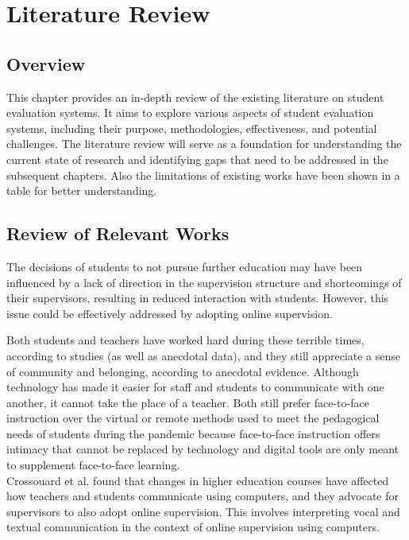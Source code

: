 \chapter{Literature Review}

\section{Overview}
This chapter provides an in-depth review of the existing literature on student evaluation systems. It aims to explore various aspects of student evaluation systems, including their purpose, methodologies, effectiveness, and potential challenges. The literature review will serve as a foundation for understanding the current state of research and identifying gaps that need to be addressed in the subsequent chapters. Also the limitations of existing works have been shown in a table for better understanding.


\section{Review of Relevant Works}

The decisions of students to not pursue further education may have been influenced by a lack of direction in the supervision structure and shortcomings of their supervisors, resulting in reduced interaction with students. However, this issue could be effectively addressed by adopting online supervision.

Both students and teachers have worked hard during these terrible times, according to studies (as well as anecdotal data), and they still appreciate a sense of community and belonging, according to anecdotal evidence. Although technology has made it easier for staff and students to communicate with one another, it cannot take the place of a teacher. Both still prefer face-to-face instruction over the virtual or remote methods used to meet the pedagogical needs of students during the pandemic because face-to-face instruction offers intimacy that cannot be replaced by technology and digital tools are only meant to supplement face-to-face learning.\cite{sia2020facing}\\

Crossouard et al. found that changes in higher education courses have affected how teachers and students communicate using computers, and they advocate for supervisors to also adopt online supervision. This involves interpreting vocal and textual communication in the context of online supervision using computers.\cite{crossouard2008developing}

